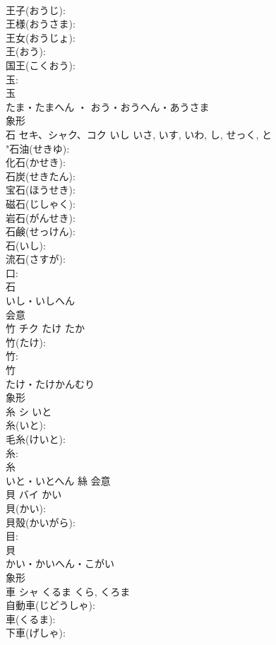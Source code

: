 \documentclass[8pt]{extreport}
\begin{document}
\begin{CJK}{UTF8}{min}
\\	王子(おうじ): 
\\	王様(おうさま): 
\\	王女(おうじょ): 
\\	王(おう): 
\\	国王(こくおう): 
\\	玉: 
\\	玉	
\\	たま・たまへん ・ おう・おうへん・あうさま	
\\	象形 
\\	石	セキ、シャク、コク	いし	いさ, いす, いわ, し, せっく, と	
\\	"石油(せきゆ): 
\\	化石(かせき): 
\\	石炭(せきたん): 
\\	宝石(ほうせき): 
\\	磁石(じしゃく): 
\\	岩石(がんせき): 
\\	石鹸(せっけん): 
\\	石(いし): 
\\	流石(さすが): 
\\	口: 
\\	石	
\\	いし・いしへん	
\\	会意 
\\	竹	チク	たけ	たか	
\\	竹(たけ): 
\\	竹: 
\\	竹	
\\	たけ・たけかんむり	
\\	象形 
\\	糸	シ	いと		
\\	糸(いと): 
\\	毛糸(けいと): 
\\	糸: 
\\	糸	
\\	いと・いとへん	絲	会意 
\\	貝	バイ	かい		
\\	貝(かい): 
\\	貝殼(かいがら): 
\\	目: 
\\	貝	
\\	かい・かいへん・こがい	
\\	象形 
\\	車	シャ	くるま	くら, くろま	
\\	自動車(じどうしゃ): 
\\	車(くるま): 
\\	下車(げしゃ): 

\end{CJK}
\end{document}
